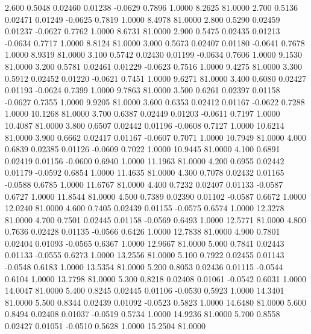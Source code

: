    2.600   0.5048   0.02460   0.01238  -0.0629   0.7896   1.0000   8.2625  81.0000
   2.700   0.5136   0.02471   0.01249  -0.0625   0.7819   1.0000   8.4978  81.0000
   2.800   0.5290   0.02459   0.01237  -0.0627   0.7762   1.0000   8.6731  81.0000
   2.900   0.5475   0.02435   0.01213  -0.0634   0.7717   1.0000   8.8124  81.0000
   3.000   0.5673   0.02407   0.01180  -0.0641   0.7678   1.0000   8.9319  81.0000
   3.100   0.5742   0.02430   0.01199  -0.0634   0.7606   1.0000   9.1530  81.0000
   3.200   0.5781   0.02461   0.01229  -0.0623   0.7516   1.0000   9.4275  81.0000
   3.300   0.5912   0.02452   0.01220  -0.0621   0.7451   1.0000   9.6271  81.0000
   3.400   0.6080   0.02427   0.01193  -0.0624   0.7399   1.0000   9.7863  81.0000
   3.500   0.6261   0.02397   0.01158  -0.0627   0.7355   1.0000   9.9205  81.0000
   3.600   0.6353   0.02412   0.01167  -0.0622   0.7288   1.0000  10.1268  81.0000
   3.700   0.6387   0.02449   0.01203  -0.0611   0.7197   1.0000  10.4087  81.0000
   3.800   0.6507   0.02442   0.01196  -0.0608   0.7127   1.0000  10.6214  81.0000
   3.900   0.6662   0.02417   0.01167  -0.0607   0.7071   1.0000  10.7949  81.0000
   4.000   0.6839   0.02385   0.01126  -0.0609   0.7022   1.0000  10.9445  81.0000
   4.100   0.6891   0.02419   0.01156  -0.0600   0.6940   1.0000  11.1963  81.0000
   4.200   0.6955   0.02442   0.01179  -0.0592   0.6854   1.0000  11.4635  81.0000
   4.300   0.7078   0.02432   0.01165  -0.0588   0.6785   1.0000  11.6767  81.0000
   4.400   0.7232   0.02407   0.01133  -0.0587   0.6727   1.0000  11.8544  81.0000
   4.500   0.7389   0.02390   0.01102  -0.0587   0.6672   1.0000  12.0240  81.0000
   4.600   0.7405   0.02439   0.01155  -0.0575   0.6574   1.0000  12.3278  81.0000
   4.700   0.7501   0.02445   0.01158  -0.0569   0.6493   1.0000  12.5771  81.0000
   4.800   0.7636   0.02428   0.01135  -0.0566   0.6426   1.0000  12.7838  81.0000
   4.900   0.7801   0.02404   0.01093  -0.0565   0.6367   1.0000  12.9667  81.0000
   5.000   0.7841   0.02443   0.01133  -0.0555   0.6273   1.0000  13.2556  81.0000
   5.100   0.7922   0.02455   0.01143  -0.0548   0.6183   1.0000  13.5354  81.0000
   5.200   0.8053   0.02436   0.01115  -0.0544   0.6104   1.0000  13.7798  81.0000
   5.300   0.8218   0.02408   0.01061  -0.0542   0.6031   1.0000  14.0047  81.0000
   5.400   0.8245   0.02445   0.01106  -0.0530   0.5923   1.0000  14.3401  81.0000
   5.500   0.8344   0.02439   0.01092  -0.0523   0.5823   1.0000  14.6480  81.0000
   5.600   0.8494   0.02408   0.01037  -0.0519   0.5734   1.0000  14.9236  81.0000
   5.700   0.8558   0.02427   0.01051  -0.0510   0.5628   1.0000  15.2504  81.0000
